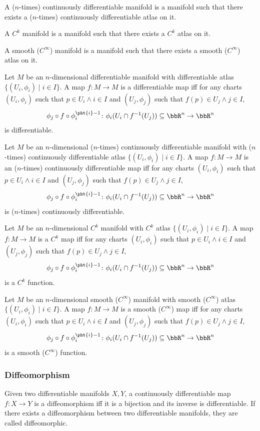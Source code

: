 \documentclass[a4paper,12pt]{article}
\begin{document}
A ($n$-times) continuously differentiable manifold is a manifold such that there exists a ($n$-times) continuously differentiable atlas on it.

A $C^k$ manifold is a manifold such that there exists a $C^k$ atlas on it.

A smooth ($C^\infty$) manifold is a manifold such that there exists a smooth ($C^\infty$) atlas on it.

Let $M$ be an $n$-dimensional differentiable manifold with differentiable atlas $\{(U_i,\phi_i)\mid i\in I\}$. A map $f\colon M\to M$ is a differentiable map iff for any charts $(U_i,\phi_i)$ such that $p\in U_i\land i\in I$ and $(U_j,\phi_j)$ such that $f(p)\in U_j\land j\in I$,
\[\phi_j\circ f\circ\phi_i^{\pht{i}-1}\colon\phi_i(U_i\cap f^{-1}(U_j))\subseteq\bbR^n\to\bbR^n\]
is differentiable.

Let $M$ be an $n$-dimensional ($n$-times) continuously differentiable manifold with ($n$-times) continuously differentiable atlas $\{(U_i,\phi_i)\mid i\in I\}$. A map $f\colon M\to M$ is an ($n$-times) continuously differentiable map iff for any charts $(U_i,\phi_i)$ such that $p\in U_i\land i\in I$ and $(U_j,\phi_j)$ such that $f(p)\in U_j\land j\in I$,
\[\phi_j\circ f\circ\phi_i^{\pht{i}-1}\colon\phi_i(U_i\cap f^{-1}(U_j))\subseteq\bbR^n\to\bbR^n\]
is ($n$-times) continuously differentiable.

Let $M$ be an $n$-dimensional $C^k$ manifold with $C^k$ atlas $\{(U_i,\phi_i)\mid i\in I\}$. A map $f\colon M\to M$ is a $C^k$ map iff for any charts $(U_i,\phi_i)$ such that $p\in U_i\land i\in I$ and $(U_j,\phi_j)$ such that $f(p)\in U_j\land j\in I$,
\[\phi_j\circ f\circ\phi_i^{\pht{i}-1}\colon\phi_i(U_i\cap f^{-1}(U_j))\subseteq\bbR^n\to\bbR^n\]
is a $C^k$ function.

Let $M$ be an $n$-dimensional smooth ($C^\infty$) manifold with smooth ($C^\infty$) atlas $\{(U_i,\phi_i)\mid i\in I\}$. A map $f\colon M\to M$ is a smooth ($C^\infty$) map iff for any charts $(U_i,\phi_i)$ such that $p\in U_i\land i\in I$ and $(U_j,\phi_j)$ such that $f(p)\in U_j\land j\in I$,
\[\phi_j\circ f\circ\phi_i^{\pht{i}-1}\colon\phi_i(U_i\cap f^{-1}(U_j))\subseteq\bbR^n\to\bbR^n\]
is a smooth ($C^\infty$) function.
\subsubsection{Diffeomorphism}
Given two differentiable manifolds $X,Y$, a continuously differentiable map $f\colon X\to Y$ is a diffeomorphism iff it is a bijection and its inverse is differentiable. If there exists a diffeomorphism between two differentiable manifolds, they are called diffeomorphic.
\end{document}
